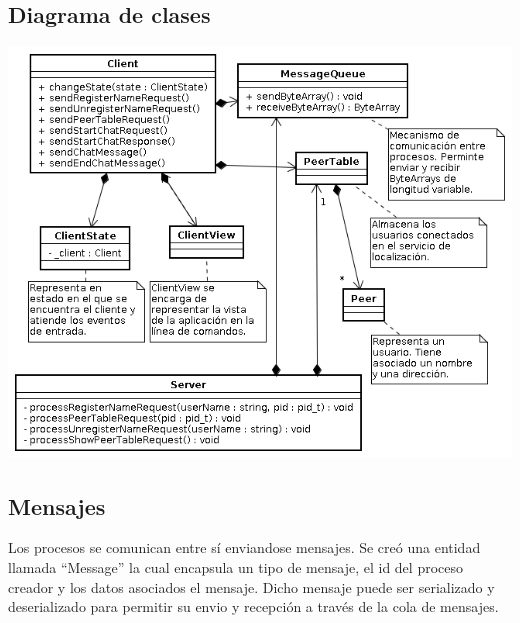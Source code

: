 \subsection{Diagrama de clases}
\begin{center}
\small\includegraphics[scale=0.65]{./Images/DiagramaDeClases}
\end{center}

\subsection{Mensajes}

Los procesos se comunican entre sí enviandose mensajes. Se creó una entidad 
llamada ``Message'' la cual encapsula un tipo de mensaje, el id del proceso
creador y los datos asociados el mensaje. Dicho mensaje puede ser serializado
y deserializado para permitir su envio y recepción a través de la cola de mensajes.

